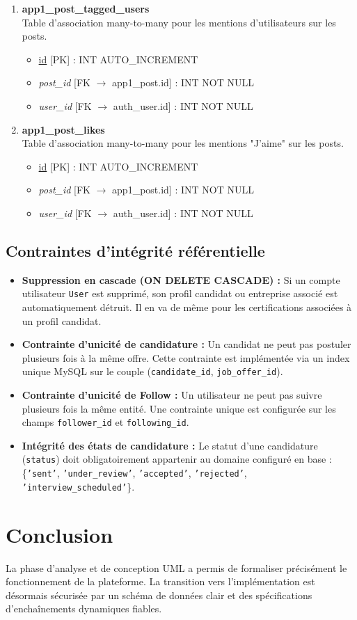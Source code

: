 \begin{enumerate}
    \item \textbf{app1\_post\_tagged\_users} \\
    Table d'association many-to-many pour les mentions d'utilisateurs sur les posts.
    \begin{itemize}
        \item \underline{id} [PK] : INT AUTO\_INCREMENT
        \item \textit{post\_id} [FK $\rightarrow$ app1\_post.id] : INT NOT NULL
        \item \textit{user\_id} [FK $\rightarrow$ auth\_user.id] : INT NOT NULL
    \end{itemize}

    \item \textbf{app1\_post\_likes} \\
    Table d'association many-to-many pour les mentions "J'aime" sur les posts.
    \begin{itemize}
        \item \underline{id} [PK] : INT AUTO\_INCREMENT
        \item \textit{post\_id} [FK $\rightarrow$ app1\_post.id] : INT NOT NULL
        \item \textit{user\_id} [FK $\rightarrow$ auth\_user.id] : INT NOT NULL
    \end{itemize}
\end{enumerate}

\subsection{Contraintes d'intégrité référentielle}
\begin{itemize}
    \item \textbf{Suppression en cascade (ON DELETE CASCADE) :} Si un compte utilisateur \texttt{User} est supprimé, son profil candidat ou entreprise associé est automatiquement détruit. Il en va de même pour les certifications associées à un profil candidat.
    \item \textbf{Contrainte d'unicité de candidature :} Un candidat ne peut pas postuler plusieurs fois à la même offre. Cette contrainte est implémentée via un index unique MySQL sur le couple (\texttt{candidate\_id}, \texttt{job\_offer\_id}).
    \item \textbf{Contrainte d'unicité de Follow :} Un utilisateur ne peut pas suivre plusieurs fois la même entité. Une contrainte unique est configurée sur les champs \texttt{follower\_id} et \texttt{following\_id}.
    \item \textbf{Intégrité des états de candidature :} Le statut d'une candidature (\texttt{status}) doit obligatoirement appartenir au domaine configuré en base : \{\texttt{'sent'}, \texttt{'under\_review'}, \texttt{'accepted'}, \texttt{'rejected'}, \texttt{'interview\_scheduled'}\}.
\end{itemize}

\section{Conclusion}
La phase d'analyse et de conception UML a permis de formaliser précisément le fonctionnement de la plateforme. La transition vers l'implémentation est désormais sécurisée par un schéma de données clair et des spécifications d'enchaînements dynamiques fiables.
\newpage

